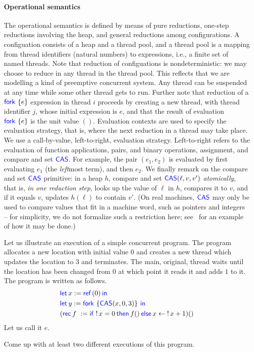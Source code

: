 \paragraph*{Operational semantics}
The operational semantics is defined by means of pure reductions,
one-step reductions involving the heap, and general reductions 
among configurations.  
A configuation consists of a heap and a thread
pool, and a thread pool is a mapping from thread identifiers (natural
numbers) to expressions, i.e., a finite set of named threads.
Note that reduction of configuations is
nondeterministic: we may choose to reduce in any thread
in the thread pool.
This reflects that we are modelling a kind of preemptive concurrent system.
Any thread can be suspended at any time while some other thread gets to run.
Further note that reduction of a $\Fork{e}$ expression in thread $i$ 
proceeds by creating a new thread, with thread identifier $j$, whose initial expression is $e$,
and that the result of evaluation $\Fork{e}$ is the unit value $()$.
Evaluation contexts are used to specify the evaluation strategy, that is,
where the next reduction in a
thread may take place.  We use a call-by-value, left-to-right,
evaluation strategy.
Left-to-right refers to the evaluation of function applications, pairs, and binary operations, assignment, and compare and set $\textsf{\color{blue} CAS}$.
For example, the pair $(e_1,e_2)$ is evaluated by first evaluating $e_1$ (the \emph{left}most term), and then $e_2$.
We finally remark on the compare and set  $\textsf{\color{blue} CAS}$ primitive: in 
a heap $h$, compare and set $\textsf{\color{blue} CAS}(\ell,v,v')$ \emph{atomically},
that is, \emph{in one reduction step}, looks up the value of $\ell$ in
$h$, compares it to $v$, and if it equals $v$, updates $h(\ell)$ to
contain $v'$.
(On real machines, $\textsf{\color{blue} CAS}$ may only be used to compare values that fit
in a machine word, such as pointers and integers -- for simplicity, we
do not formalize such a restriction here; see~\cite{logrel-fcd} for
an example of how it may be done.)

Let us illustrate an execution of a simple concurrent program.
The program allocates a new location with initial value $0$ and creates a new thread which updates the location to $3$ and terminates.
The main, \ie{} original, thread waits until the location has been changed from $0$ at which point it reads it and adds $1$ to it.
The program is written as follows.
\begin{align*}
  &\Let x = \Ref(0) in\\
  &\Let y = \Fork{\CAS(x,0,3)} in\\
  &(\Rec{f} {} = \If \deref x = 0 then f \TT \Else x \gets \deref{x} + 1) \TT
\end{align*}
Let us call it $e$.
\begin{exercise}
  Come up with at least two different executions of this program.
\end{exercise}


